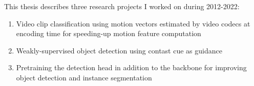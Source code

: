 This thesis describes three research projects I worked on during 2012-2022:
\begin{enumerate}
\item Video clip classification using motion vectors estimated by video codecs at encoding time for speeding-up motion feature computation
\item Weakly-supervised object detection using contast cue as guidance
\item Pretraining the detection head in addition to the backbone for improving object detection and instance segmentation
\end{enumerate}
